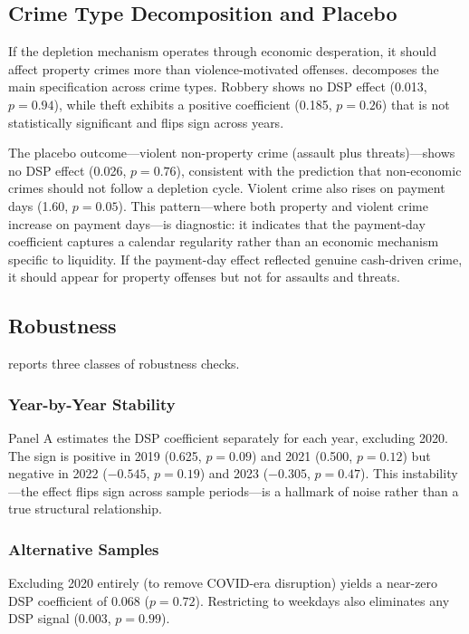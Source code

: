 \documentclass[12pt]{article}
\begin{document}


\subsection{Crime Type Decomposition and Placebo}

If the depletion mechanism operates through economic desperation, it should affect property crimes more than violence-motivated offenses.  decomposes the main specification across crime types. Robbery shows no DSP effect (0.013, $p = 0.94$), while theft exhibits a positive coefficient (0.185, $p = 0.26$) that is not statistically significant and flips sign across years.

The placebo outcome---violent non-property crime (assault plus threats)---shows no DSP effect (0.026, $p = 0.76$), consistent with the prediction that non-economic crimes should not follow a depletion cycle. Violent crime also rises on payment days (1.60, $p = 0.05$). This pattern---where both property and violent crime increase on payment days---is diagnostic: it indicates that the payment-day coefficient captures a calendar regularity rather than an economic mechanism specific to liquidity. If the payment-day effect reflected genuine cash-driven crime, it should appear for property offenses but not for assaults and threats.



\subsection{Robustness}

 reports three classes of robustness checks.

\subsubsection*{Year-by-Year Stability} Panel A estimates the DSP coefficient separately for each year, excluding 2020. The sign is positive in 2019 (0.625, $p = 0.09$) and 2021 (0.500, $p = 0.12$) but negative in 2022 ($-0.545$, $p = 0.19$) and 2023 ($-0.305$, $p = 0.47$). This instability---the effect flips sign across sample periods---is a hallmark of noise rather than a true structural relationship.

\subsubsection*{Alternative Samples} Excluding 2020 entirely (to remove COVID-era disruption) yields a near-zero DSP coefficient of 0.068 ($p = 0.72$). Restricting to weekdays also eliminates any DSP signal (0.003, $p = 0.99$).
\end{document}
